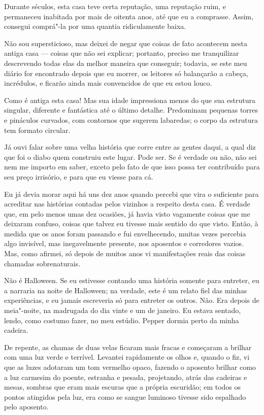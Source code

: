 Durante séculos, esta casa teve certa reputação, uma reputação ruim, e permaneceu inabitada por mais de oitenta
anos, até que eu a comprasse. Assim, consegui comprá"-la por uma quantia ridiculamente baixa.

Não sou supersticioso, mas deixei de negar que coisas de fato acontecem nesta antiga casa --- coisas que não sei
explicar; portanto, preciso me tranquilizar descrevendo todas elas da melhor maneira que conseguir; todavia, se este meu
diário for encontrado depois que eu morrer, os leitores só balançarão a cabeça, incrédulos, e ficarão ainda mais
convencidos de que eu estou louco.

Como é antiga esta casa! Mas sua idade impressiona menos do que sua estrutura singular, diferente e fantástica até o
último detalhe. Predominam pequenas torres e pináculos curvados, com contornos que sugerem labaredas; o corpo da
estrutura tem formato circular.

Já ouvi falar sobre uma velha história que corre entre as gentes daqui, a qual diz que foi o diabo quem construiu este
lugar. Pode ser. Se é verdade ou não, não sei nem me importo em saber, exceto pelo fato de que isso possa
ter contribuído para seu preço irrisório, e para que eu viesse para cá.

Eu já devia morar aqui há uns dez anos quando percebi que vira o suficiente para acreditar nas histórias contadas pelos
vizinhos a respeito desta casa. É verdade que, em pelo menos umas dez ocasiões, já havia visto vagamente coisas que me
deixaram confuso, coisas que talvez eu tivesse mais sentido do que visto. Então, à medida que os anos foram passando e
fui envelhecendo, muitas vezes percebia algo invisível, mas inegavelmente presente, nos aposentos e corredores vazios.
Mas, como afirmei, só depois de muitos anos vi manifestações reais das coisas chamadas sobrenaturais.

Não é Halloween. Se eu estivesse contando uma história somente para entreter, eu a narraria na noite de Halloween; na
verdade, este é um relato fiel das minhas experiências, e eu jamais escreveria só para entreter os outros.
Não. Era depois de meia"-noite, na madrugada do dia vinte e um de janeiro. Eu estava sentado, lendo, como costumo fazer,
no meu estúdio. Pepper dormia perto da minha cadeira.

De repente, as chamas de duas velas ficaram mais fracas e começaram a brilhar com uma luz verde e terrível. Levantei
rapidamente os olhos e, quando o fiz, vi que as luzes adotaram um tom vermelho opaco, fazendo o aposento brilhar como a
luz carmesim do poente, estranha e pesada, projetando, atrás das cadeiras e mesas, sombras que eram mais escuras que a
própria escuridão; em todos os pontos atingidos pela luz, era como se sangue luminoso tivesse sido espalhado pelo
aposento.

